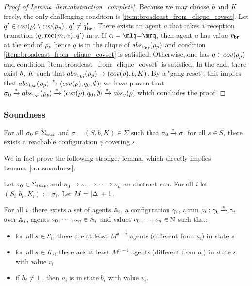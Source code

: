 \begin{proof}[Proof of Lemma~\ref{lem:abstraction_complete}]
	Because we may choose $\boss$ and $\clique$ freely, the only challenging condition is \ref{item:broadcast_from_clique_covset}.
	Let $q' \in \statesin{\run} \setminus \statesin{\run_p}$, $q' \ne q_{\textbf{br}}'$. 
	There exists an agent $a$ that takes a reception transition $(q,\textbf{rec}(m, \alpha),q')$ in $s$. 
	If $\anact = \quotemarks{\eqtestact}$, then agent $a$ has value $v_{\textbf{br}}$ at the end of $\rho_p$ hence $q$ is in the clique of $\absproj{\avalbr}{\run_p}$ and condition \ref{item:broadcast_from_clique_covset} is satisfied. Otherwise, one has $q \in \statesin{\run_p}$ and condition \ref{item:broadcast_from_clique_covset} is satisfied.
	In the end, there exist $\boss$, $\clique$ such that $\absproj{\avalbr}{\run_p} \step{} (\statesin{\run}, \boss,\clique)$. By a "gang reset", this implies that $\absproj{\avalbr}{\run_p} \step{*} (\statesin{\run}, q_0, \emptyset)$; we have proven that $\aconfiginit \step{*}\absproj{\avalbr}{\run_p} \step{*} (\statesin{\run}, q_0, \emptyset) \step{*} \absproj{\aval}{\run}$ which concludes the proof. 
\end{proof}


\subsubsection{Soundness}
\label{sec:one-soundness}

\begin{lemma}
	\label{cor:soundness}
	For all $\sigma_0 \in \aconfiginitset$ and $\sigma = (S, b, K) \in \Sigma$ such that $\sigma_0 \xrightarrow{*} \sigma$, for all $s \in S$, there exists a reachable configuration $\gamma$ covering $s$.
\end{lemma}


We in fact prove the following stronger lemma, which directly implies Lemma~\ref{cor:soundness}.

\begin{lemma}
	\label{lem:correctness-construction}
	
	
	Let $\sigma_0 \in \aconfiginitset$, and $\sigma_0 \to \sigma_1 \to \cdots \to \sigma_n$ an abstract run. For all $i$ let $(S_i, b_i, K_i) := \sigma_i$. Let $M = |\Delta|+1$.
	
	For all $i$, there exists a set of agents $\mathbb{A}_i$, a configuration $\gamma_i$, a run $\rho_i : \gamma_0 \xrightarrow{*} \gamma_i$ over $\mathbb{A}_i$, agents $a_0, \cdots, a_n \in \mathbb{A}_i$ and values $v_0, \ldots, v_n \in \mathbb{N}$ such that:
	\begin{itemize}
		\item for all $s \in S_i$, there are at least $M^{n-i}$ agents (different from $a_i$) in state $s$ 
		
		\item for all $s \in K_i$, there are at least $M^{n-i}$ agents (different from $a_i$) in state $s$ with value $v_i$
		
		\item if $b_i \neq \bot$, then $a_i$ is in state $b_i$ with value $v_i$.
	\end{itemize}
\end{lemma}

